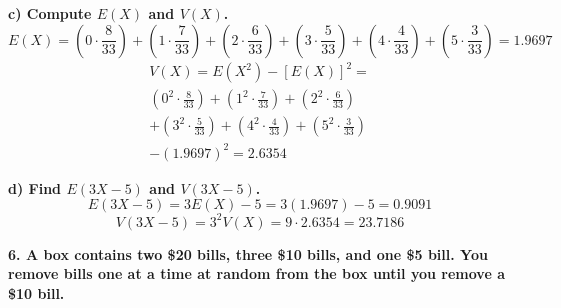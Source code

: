 \documentclass[12pt, letter]{article}
\begin{document}
\qquad \textbf{c) Compute $E(X)$ and $V(X)$.}
$$E(X)=\left(0 \cdot \frac{8}{33}\right)+\left(1 \cdot \frac{7}{33}\right)+\left(2 \cdot \frac{6}{33}\right)+\left(3 \cdot \frac{5}{33}\right)+\left(4 \cdot \frac{4}{33}\right)+\left(5 \cdot \frac{3}{33}\right)=\boxed{1.9697}$$
\begin{multline*}
	V(X)=E(X^{2})-[E(X)]^{2}= \\
	\left(0^{2} \cdot \frac{8}{33}\right)+\left(1^{2} \cdot \frac{7}{33}\right)+\left(2^{2} \cdot \frac{6}{33}\right) \\
	+\left(3^{2} \cdot \frac{5}{33}\right)+\left(4^{2} \cdot \frac{4}{33}\right)+\left(5^{2} \cdot \frac{3}{33}\right) \\
	-(1.9697)^{2}=\boxed{2.6354}
\end{multline*}

\qquad \textbf{d) Find $E(3X - 5)$ and $V(3X - 5)$.}
$$E(3X-5)=3E(X)-5=3(1.9697)-5=\boxed{0.9091}$$
$$V(3X-5)=3^{2}V(X)=9 \cdot 2.6354=\boxed{23.7186}$$


\textbf{6. A box contains two \$20 bills, three \$10 bills, and one \$5 bill. You remove bills one at a time at random from the box until you remove a \$10 bill.}

\pagebreak
\end{document}
